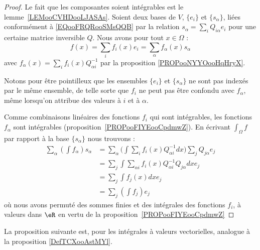 \begin{proof}
	Le fait que les composantes soient intégrables est le lemme~\ref{LEMooCVHDooLJASAs}. Soient deux bases de \( V\), \( \{ e_i \}\) et \( \{ s_{\alpha} \}\), liées conformément à \eqref{EQooFRQRooSMsQQB} par la relation \( s_{\alpha}=\sum_iQ_{i\alpha}e_i\) pour une certaine matrice inversible \( Q\). Nous avons pour tout \( x\in \Omega\) :
	\begin{equation}
		f(x)=\sum_if_i(x)e_i=\sum_{\alpha}f_{\alpha}(x)s_{\alpha}
	\end{equation}
	avec \( f_{\alpha}(x)=\sum_if_i(x)Q_{\alpha i}^{-1}\) par la proposition \ref{PROPooNYYOooHqHryX}.

	Notons pour être pointilleux que les ensembles \( \{ e_i \}\) et \( \{ s_{\alpha} \}\) ne sont pas indexés par le même ensemble, de telle sorte que \( f_i\) ne peut pas être confondu avec \( f_{\alpha}\), même lorsqu'on attribue des valeurs à \( i\) et à \( \alpha\).

	Comme combinaisons linéaires des fonctions \( f_i\) qui sont intégrables, les fonctions \( f_{\alpha}\) sont intégrables (proposition~\ref{PROPooFIYEooCpdmwZ}). En écrivant \( \int_{\Omega}f\) par rapport à la base \( \{ s_{\alpha} \}\) nous trouvons :
	\begin{subequations}
		\begin{align}
			\sum_{\alpha}(\int f_{\alpha})s_{\alpha} & =\sum_{\alpha}\big( \int \sum_if_i(x)Q_{\alpha i}^{-1}dx \big)\sum_jQ_{j\alpha}e_j \\
			                                         & =\sum_j\int\sum_{\alpha i}f_i(x)Q_{\alpha i}^{-1}Q_{j\alpha}dxe_j                  \\
			                                         & =\sum_j\int f_j(x)dxe_j                                                            \\
			                                         & =\sum_j(\int f_j)e_j
		\end{align}
	\end{subequations}
	où nous avons permuté des sommes finies et des intégrales des fonctions \( f_i\), à valeurs dans \( \eR\) en vertu de la proposition~\ref{PROPooFIYEooCpdmwZ}
\end{proof}

La proposition suivante est, pour les intégrales à valeurs vectorielles, analogue à la proposition \ref{DefTCXooAstMYl}.

